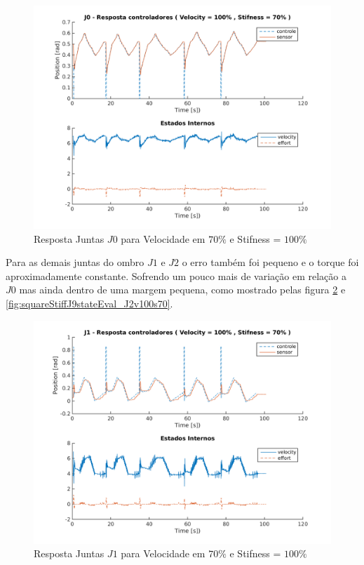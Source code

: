 \begin{figure}[H]
    \centering
    \includegraphics[width=0.6\linewidth,trim={2cm 1cm 2cm 2cm}]{tex/figs/squareStiffJ9stateEval_J0v100s70.png}
    \caption{Resposta Juntas $J0$ para Velocidade em $70\%$ e Stifness = $100\%$ }
    \label{fig:squareStiffJ9stateEval_J0v100s70}
\end{figure}

Para as demais juntas do ombro $J1$ e $J2$ o erro também foi pequeno e o torque foi aproximadamente constante. Sofrendo um pouco mais de variação em relação a $J0$ mas ainda dentro de uma margem pequena, como mostrado pelas figura \ref{fig:squareStiffJ9stateEval_J1v100s70} e \ref{fig:squareStiffJ9stateEval_J2v100s70}.

\vspace{1cm}
\begin{figure}[H]
    \centering
    \includegraphics[width=0.6\linewidth,trim={2cm 1cm 2cm 2cm}]{tex/figs/squareStiffJ9stateEval_J1v100s70.png}
    \caption{Resposta Juntas $J1$ para Velocidade em $70\%$ e Stifness = $100\%$ }
    \label{fig:squareStiffJ9stateEval_J1v100s70}
\end{figure}

\vspace{1cm}

